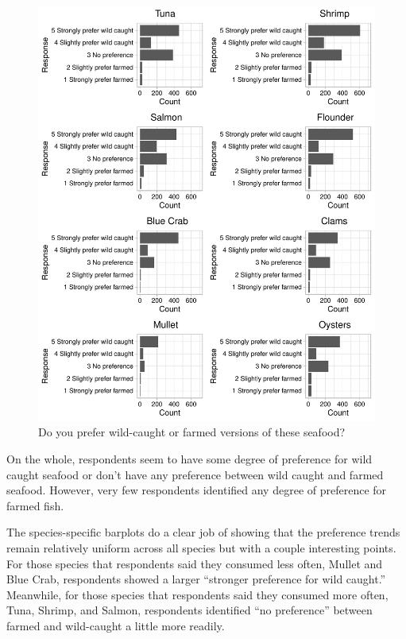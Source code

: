 \documentclass[
  12pt,
]{article}
\begin{document}
\begin{figure}
\centering
\includegraphics{Final_rmd_files/figure-latex/preference-1.pdf}
\caption{Do you prefer wild-caught or farmed versions of these seafood?}
\end{figure}

On the whole, respondents seem to have some degree of preference for
wild caught seafood or don't have any preference between wild caught and
farmed seafood. However, very few respondents identified any degree of
preference for farmed fish.

The species-specific barplots do a clear job of showing that the
preference trends remain relatively uniform across all species but with
a couple interesting points. For those species that respondents said
they consumed less often, Mullet and Blue Crab, respondents showed a
larger ``stronger preference for wild caught.'' Meanwhile, for those
species that respondents said they consumed more often, Tuna, Shrimp,
and Salmon, respondents identified ``no preference'' between farmed and
wild-caught a little more readily.
\end{document}
